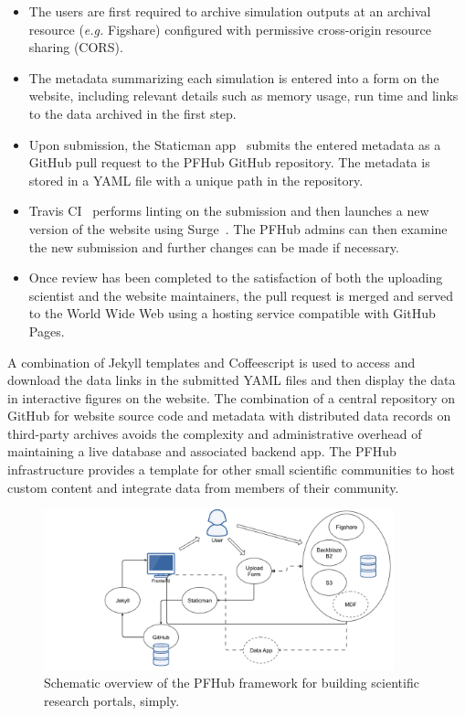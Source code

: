 \documentclass{jors}
\begin{document}
\begin{itemize}
  \item The users are first required to archive simulation outputs at
    an archival resource (\textit{e.g.} Figshare) configured with
    permissive cross-origin resource sharing (CORS).
  \item The metadata summarizing each simulation is entered into a
    form on the website, including relevant details such as memory
    usage, run time and links to the data archived in the first step.
  \item Upon submission, the Staticman app~\cite{staticman} submits
    the entered metadata as a GitHub pull request to the PFHub GitHub
    repository.  The metadata is stored in a YAML file with a unique
    path in the repository.
  \item Travis CI~\cite{travis} performs linting on the submission and
    then launches a new version of the website using
    Surge~\cite{surge}. The PFHub admins can then examine the new
    submission and further changes can be made if necessary.
  \item Once review has been completed to the satisfaction of both the
    uploading scientist and the website maintainers, the pull request
    is merged and served to the World Wide Web using a hosting service
    compatible with GitHub Pages.
\end{itemize}

A combination of Jekyll templates and Coffeescript is used to access
and download the data links in the submitted YAML files and then
display the data in interactive figures on the website. The
combination of a central repository on GitHub for website source code
and metadata with distributed data records on third-party archives
avoids the complexity and administrative overhead of maintaining a
live database and associated backend app. The PFHub infrastructure
provides a template for other small scientific communities to host
custom content and integrate data from members of their community.

\begin{figure}
  \includegraphics[width=4in]{pfhub_website.png}
  \caption{Schematic overview of the PFHub framework for building
    scientific research portals, simply.}
  \centering
  \label{fig:pfhub_website}
\end{figure}
\end{document}
